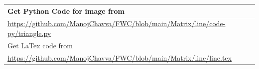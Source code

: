 \documentclass[journal,12pt,twocolumn]{IEEEtran}
\begin{document}


\begin{table}[h]
\large
\begin{tabular}{lll}
\multicolumn{3}{l}{Get Python Code for image from}                                                 \\ \hline
\multicolumn{3}{|l|}{\url{https://github.com/ManojChavva/FWC/blob/main/Matrix/line/code-py/triangle.py}} \\ 
 \hline
\multicolumn{3}{l}{Get LaTex code from}                                                            \\ \hline
\multicolumn{3}{|l|}{\url{https://github.com/ManojChavva/FWC/blob/main/Matrix/line/line.tex}}            \\ \hline
\end{tabular}
\end{table}
\end{document}
